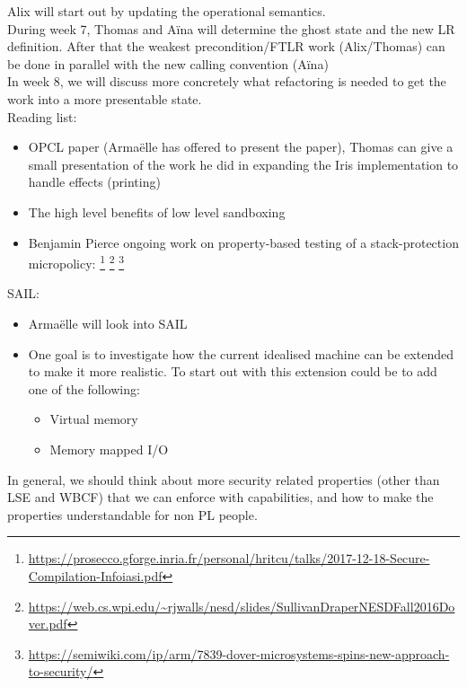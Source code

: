 \documentclass{article}
\begin{document}
Alix will start out by updating the operational semantics. \\
During week 7, Thomas and A\"{i}na will determine the ghost state and the new LR definition. After that the weakest precondition/FTLR work (Alix/Thomas) can be done in parallel with the new calling convention (A\"{i}na)
\\[0.5em]
In week 8, we will discuss more concretely what refactoring is needed to get the work into a more presentable state. 
\\[1em]
Reading list: 
\begin{itemize}
\item OPCL paper (Arma\"{e}lle has offered to present the paper), Thomas can give a small presentation of the work he did in expanding the Iris implementation to handle effects (printing)
\item The high level benefits of low level sandboxing 
\item Benjamin Pierce ongoing work on property-based testing of a stack-protection micropolicy: 
\footnote{
\url{https://prosecco.gforge.inria.fr/personal/hritcu/talks/2017-12-18-Secure-Compilation-Infoiasi.pdf}} \footnote{\url{https://web.cs.wpi.edu/~rjwalls/nesd/slides/SullivanDraperNESDFall2016Dover.pdf}} \footnote{\url{https://semiwiki.com/ip/arm/7839-dover-microsystems-spins-new-approach-to-security/}}

\end{itemize}

SAIL: 
\begin{itemize}
\item Arma\"{e}lle will look into SAIL
\item One goal is to investigate how the current idealised machine can be extended to make it more realistic. To start out with this extension could be to add one of the following: 
	\begin{itemize}
		\item Virtual memory
    		\item Memory mapped I/O	
	\end{itemize}
\end{itemize}

In general, we should think about more security related properties (other than LSE and WBCF) that we can enforce with capabilities, and how to make the properties understandable for non PL people. 
\end{document}
